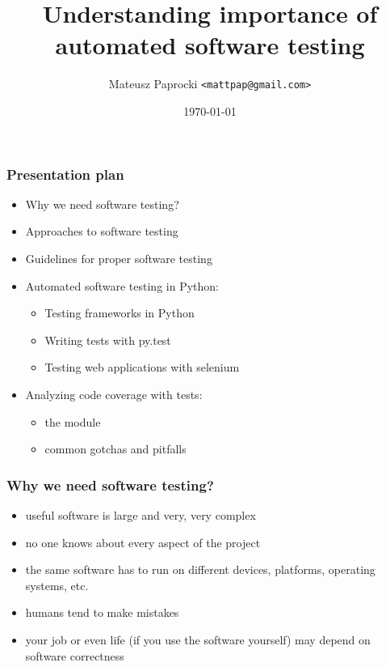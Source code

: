 \documentclass{beamer}
\title{Understanding importance of automated software testing}
\author{Mateusz Paprocki \texttt{<mattpap@gmail.com>}}
\institute{SymPy Development Team}
\date{\today}
\begin{document}

\frame{\titlepage}

\begin{frame}[fragile]
    \frametitle{Presentation plan}

    \begin{itemize}
        \item Why we need software testing?
        \item Approaches to software testing
        \item Guidelines for proper software testing
        \item Automated software testing in Python:
            \begin{itemize}
                \item Testing frameworks in Python
                \item Writing tests with py.test
                \item Testing web applications with selenium
            \end{itemize}
        \item Analyzing code coverage with tests:
            \begin{itemize}
                \item the  module
                \item common gotchas and pitfalls
            \end{itemize}
    \end{itemize}
\end{frame}

\begin{frame}[fragile]
    \frametitle{Why we need software testing?}

    \begin{itemize}
        \item useful software is large and very, very complex
        \item no one knows about every aspect of the project
        \item the same software has to run on different devices,
        platforms, operating systems, etc.
        \item humans tend to make mistakes
        \item your job or even life (if you use the software
        yourself) may depend on software correctness
    \end{itemize}
\end{frame}
\end{document}
